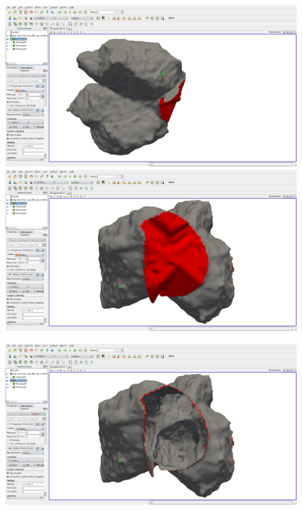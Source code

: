 \documentclass{InsightArticle}
\begin{document}
\begin{figure}
\center
\includegraphics[width=\textwidth]{images/vtkDiscreteMarchingCubes_extension_04}
\includegraphics[width=\textwidth]{images/vtkDiscreteMarchingCubes_extension_05}
\label{fig:}
\end{figure}

\begin{figure}
\center
\includegraphics[width=\textwidth]{images/vtkDiscreteMarchingCubes_extension_06}
\label{fig:}
\end{figure}
\end{document}
